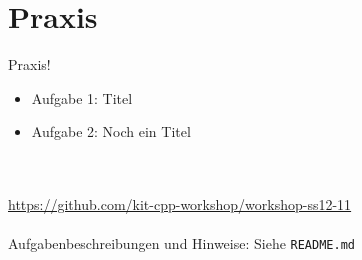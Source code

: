 \section{Praxis}
\begin{frame}[fragile]{Praxis!}
	\begin{itemize}
		\item Aufgabe 1: Titel
		\item Aufgabe 2: Noch ein Titel
	\end{itemize}
	\ \\
	\ \\
	\large{\url{https://github.com/kit-cpp-workshop/workshop-ss12-11}} \\
	\ \\
	Aufgabenbeschreibungen und Hinweise: Siehe \verb|README.md|

\end{frame}
